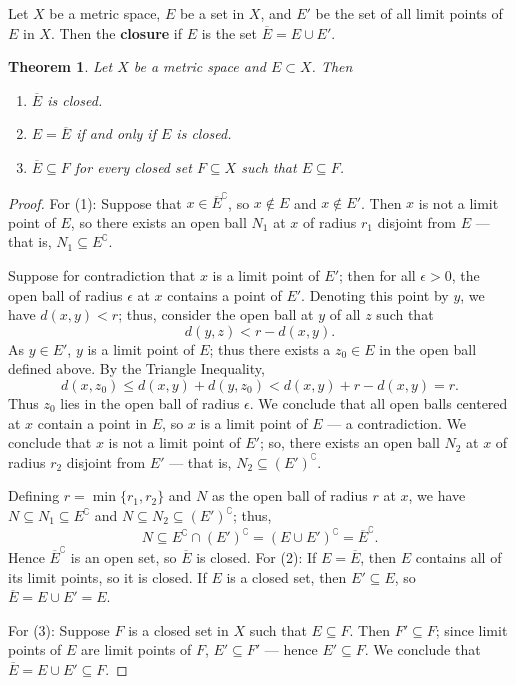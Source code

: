 \documentclass[11pt]{article}
\newtheorem{theorem}{Theorem}
\begin{document}
Let $X$ be a metric space, $E$ be a set in $X$, and $E'$ be the set of all limit points of $E$ in $X$. Then the \textbf{closure} if $E$ is the set $\overline{E} = E \cup E'$.

\begin{adjustwidth}{1cm}{}
	\begin{theorem}
		Let $X$ be a metric space and $E \subset X$. Then
		\begin{enumerate}
			\item $\overline{E}$ is closed.
			\item $E = \overline{E}$ if and only if $E$ is closed.
			\item $\overline{E} \subseteq F$ for every closed set $F \subseteq X$ such that $E \subseteq F$.
		\end{enumerate}
	\end{theorem}
	\begin{proof}
		For (1): Suppose that $x \in \overline{E}^{\complement}$, so $x \notin E$ and $x \notin E'$. Then $x$ is not a limit point of $E$, so there exists an open ball $N_{1}$ at $x$ of radius $r_{1}$ disjoint from $E$ --- that is, $N_{1} \subseteq E^{\complement}$.

		Suppose for contradiction that $x$ is a limit point of $E'$; then for all $\epsilon > 0$, the open ball of radius $\epsilon$ at $x$ contains a point of $E'$. Denoting this point by $y$, we have $d(x, y) < r$; thus, consider the open ball at $y$ of all $z$ such that
		\[
			d(y, z) < r - d(x, y).
		\]
		As $y \in E'$, $y$ is a limit point of $E$; thus there exists a $z_{0} \in E$ in the open ball defined above. By the Triangle Inequality,
		\[
			d(x, z_{0}) \le d(x, y) + d(y, z_{0}) < d(x, y) + r - d(x, y) = r.
		\]
		Thus $z_{0}$ lies in the open ball of radius $\epsilon$. We conclude that all open balls centered at $x$ contain a point in $E$, so $x$ is a limit point of $E$ --- a contradiction. We conclude that $x$ is not a limit point of $E'$; so, there exists an open ball $N_{2}$ at $x$ of radius $r_{2}$ disjoint from $E'$ --- that is, $N_{2} \subseteq (E')^{\complement}$. 
		
		Defining $r = \min \{ r_{1}, r_{2} \}$ and $N$ as the open ball of radius $r$ at $x$, we have $N \subseteq N_{1} \subseteq E^{\complement}$ and $N \subseteq N_{2} \subseteq (E')^{\complement}$; thus,
		\[
			N \subseteq E^{\complement} \cap \left( E' \right)^{\complement} = \left( E \cup E' \right)^{\complement} = \overline{E}^{\complement}.
		\]
    Hence $\overline{E}^{\complement}$ is an open set, so $\overline{E}$ is closed. For (2): If $E = \overline{E}$, then $E$ contains all of its limit points, so it is closed. If $E$ is a closed set, then $E' \subseteq E$, so $\overline{E} = E \cup E' = E$.
		
		For (3): Suppose $F$ is a closed set in $X$ such that $E \subseteq F$. Then $F' \subseteq F$; since limit points of $E$ are limit points of $F$, $E' \subseteq F'$ --- hence $E' \subseteq F$. We conclude that $\overline{E} = E \cup E' \subseteq F$.
	\end{proof}
\end{adjustwidth}
\end{document}
